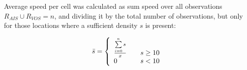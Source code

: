 \documentclass[12pt,letterpaper]{article}
\begin{document}
Average speed per cell was calculated as sum speed over all observations $R_{AIS} \cup R_{VOS} = n$, and dividing it by the total number of observations, but only for those locations where a sufficient density $s$ is present: 

\begin{equation}
 \bar{s} = \left\{
   \begin{array}{l l}
    \frac{\sum\limits_{i=0}^n s}{x} & \quad \text{$s \ge 10$}\\
    0 & \quad \text {$s < 10$}
   \end{array}\right.
\end{equation}






\end{document}

